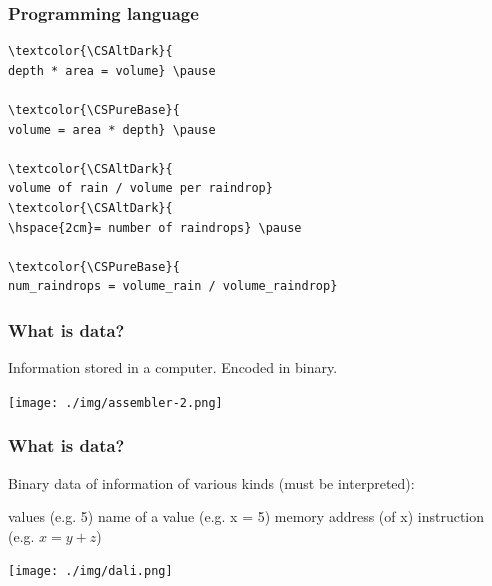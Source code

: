 \documentclass[11pt]{beamer}
\begin{document}
\begin{frame}[fragile]
  \frametitle{Programming language}
  \Enlarge
  \begin{Verbatim}[commandchars=\\\{\}]
\textcolor{\CSAltDark}{
depth * area = volume} \pause

\textcolor{\CSPureBase}{
volume = area * depth} \pause

\textcolor{\CSAltDark}{
volume of rain / volume per raindrop}
\textcolor{\CSAltDark}{
\hspace{2cm}= number of raindrops} \pause

\textcolor{\CSPureBase}{
num_raindrops = volume_rain / volume_raindrop}
  \end{Verbatim}
\end{frame}

\begin{frame}
  \frametitle{What is data?}
  \Enlarge

  \begin{itemize} \pause
    \myitem Information stored in a computer. \pause
    \myitem Encoded in binary.
  \end{itemize}
  \texttt{[image: ./img/assembler-2.png]}
\end{frame}

\begin{frame}
  \frametitle{What is data?}
  \Enlarge

  \begin{itemize}
    \myitem Binary data of information of various kinds (must be interpreted):
	\begin{itemize}
	  \mysubitem values (e.g. 5) %
	  \mysubitem name of a value (e.g. x = 5) %
	  \mysubitem memory address (of x) %
	  \mysubitem instruction (e.g. $x = y + z$) %
	\end{itemize}
  \end{itemize}
  \begin{centering}
  \hspace{15mm}\texttt{[image: ./img/dali.png]}
  \end{centering}
\end{frame}
\end{document}
